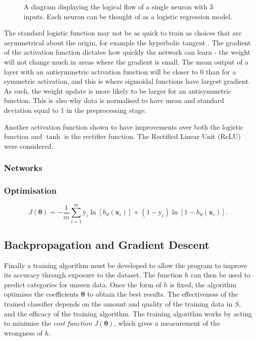 \begin{figure}[!htbp]
  \centering
  
  \caption{A diagram displaying the logical flow of a single neuron with 3 inputs. Each neuron can be thought of as a logistic regression model.}
  \label{fig:activation_functions}
\end{figure}

The standard logistic function may not be as quick to train as choices that are asymmetrical about the origin, for example the hyperbolic tangent \cite{efficientbackprop}. The gradient of the activation function dictates how quickly the network can learn - the weight will not change much in areas where the gradient is small. The mean output of a layer with an antisymmetric activation function will be closer to $0$ than for a symmetric activation, and this is where sigmoidal functions have largest gradient. As such, the weight update is more likely to be larger for an antisymmetric function. This is also why data is normalised to have mean and standard deviation equal to 1 in the preprocessing stage.

Another activation function shown to have improvements over both the logistic function and $\tanh$ is the rectifier function. The Rectified Linear Unit (ReLU) were considered.



\subsubsection{Networks}

\subsubsection{Optimisation}


%
\begin{equation}\label{eq:bce_loss}
  J(\bm\theta) = -\frac{1}{m} \sum_{i=1}^m  \mathrm{y}_i \ln[h_\theta(\mathbf{x}_i)] + (1 - \mathrm{y}_i) \ln[1 - h_\theta(\mathbf{x}_i)] .
\end{equation}
%


\subsection{Backpropagation and Gradient Descent}\label{sec:backprop_sgd}

Finally a training algorithm must be developed to allow the program to improve its accuracy through exposure to the dataset. The function $h$ can then be used to predict categories for unseen data. Once the form of $h$ is fixed, the algorithm optimises the coefficients $\bm\theta$ to obtain the best results. The effectiveness of the trained classifier depends on the amount and quality of the training data in $S$, and the efficacy of the training algorithm. The training algorithm works by acting to minimise the \textit{cost function} $J(\bm\theta)$, which gives a measurement of the wrongness of $h$.


